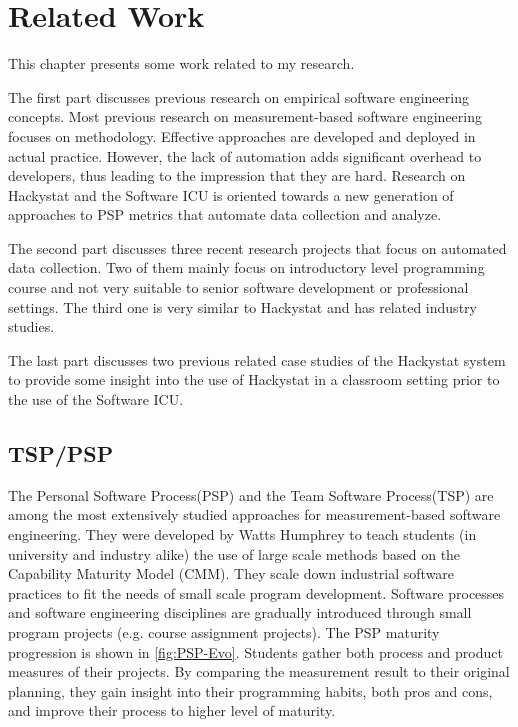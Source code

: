 \chapter{Related Work}
This chapter presents some work related to my research.

The first part discusses previous research on empirical software engineering concepts. Most previous research on measurement-based software engineering focuses on methodology. Effective approaches are developed and deployed in actual practice. However, the lack of automation adds significant overhead to developers, thus leading to the impression that they are hard. Research on Hackystat and the Software ICU is oriented towards a new generation of approaches to PSP metrics that automate data collection and analyze\cite{csdl2-02-07}.

The second part discusses three recent research projects that focus on automated data collection. Two of them mainly focus on introductory level programming course and not very suitable to senior software development or professional settings. The third one is very similar to Hackystat and has related industry studies.


The last part discusses two previous related case studies of the Hackystat system to provide some insight into the use of Hackystat in a classroom setting prior to the use of the Software ICU.

\section {TSP/PSP}
The Personal Software Process(PSP)\cite{book:psp} and the Team Software Process(TSP)\cite{book:tsp} are among the most extensively studied approaches for measurement-based software engineering. They were developed by Watts Humphrey to teach students (in university and industry alike) the use of large scale methods based on the Capability Maturity Model (CMM)\cite{cmm}. They scale down industrial software practices to fit the needs of small scale program development. Software processes and software engineering disciplines are gradually introduced through small program projects (e.g. course assignment projects). The PSP maturity progression is shown in \autoref{fig:PSP-Evo}. Students gather both process and product measures of their projects. By comparing the measurement result to their original planning, they gain insight into their programming habits, both pros and cons, and improve their process to higher level of maturity.


